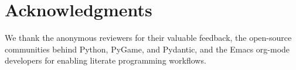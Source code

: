 \documentclass[sigconf]{acmart}
\begin{document}
\section{Acknowledgments}

We thank the anonymous reviewers for their valuable feedback, the open-source communities behind Python, PyGame, and Pydantic, and the Emacs org-mode developers for enabling literate programming workflows.



\end{document}
